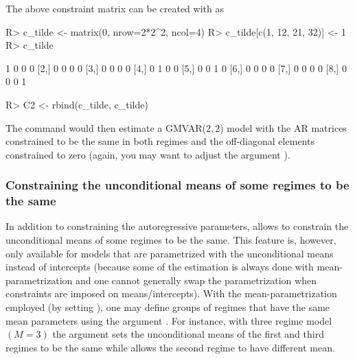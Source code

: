 \documentclass[nojss]{jss} %
\begin{document}
The above constraint matrix can be created with  as
%
\begin{Schunk}
\begin{Sinput}
R> c_tilde <- matrix(0, nrow=2*2^2, ncol=4)
R> c_tilde[c(1, 12, 21, 32)] <- 1
R> c_tilde
\end{Sinput}
\begin{Soutput}
     [,1] [,2] [,3] [,4]
[1,]    1    0    0    0
[2,]    0    0    0    0
[3,]    0    0    0    0
[4,]    0    1    0    0
[5,]    0    0    1    0
[6,]    0    0    0    0
[7,]    0    0    0    0
[8,]    0    0    0    1
\end{Soutput}
\begin{Sinput}
R> C2 <- rbind(c_tilde, c_tilde)
\end{Sinput}
\end{Schunk}
%
The command  would then estimate a GMVAR($2,2$) model with the AR matrices constrained to be the same in both regimes and the off-diagonal elements constrained to zero (again, you may want to adjust the argument ).

\subsubsection{Constraining the unconditional means of some regimes to be the same}
In addition to constraining the autoregressive parameters,  allows to constrain the unconditional means of some regimes to be the same. This feature is, however, only available for models that are parametrized with the unconditional means instead of intercepts (because some of the estimation is always done with mean-parametrization and one cannot generally swap the parametrization when constraints are imposed on means/intercepts). With the mean-parametrization employed (by setting ), one may define groups of regimes that have the same mean parameters using the argument . For instance, with three regime model $(M=3)$ the argument  sets the unconditional means of the first and third regimes to be the same while allows the second regime to have different mean.
\end{document}
